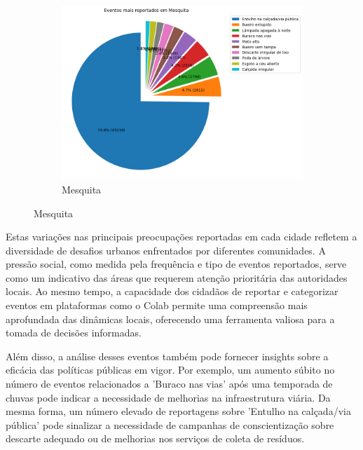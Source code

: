 \begin{figure}[htb]
\begin{subfigure}[b]{0.317\textwidth}
	\end{subfigure} ~
	\begin{subfigure}[b]{0.317\textwidth}
		\includegraphics[width=\textwidth]{images/pie_event_distribution_mesquita.png}
		\caption{Mesquita}
		\label{fig:mesquita-pie}
	\end{subfigure}
\end{figure}


Estas variações nas principais preocupações reportadas em cada cidade refletem a diversidade de desafios urbanos enfrentados por diferentes comunidades. A pressão social, como medida pela frequência e tipo de eventos reportados, serve como um indicativo das áreas que requerem atenção prioritária das autoridades locais. Ao mesmo tempo, a capacidade dos cidadãos de reportar e categorizar eventos em plataformas como o Colab permite uma compreensão mais aprofundada das dinâmicas locais, oferecendo uma ferramenta valiosa para a tomada de decisões informadas.

Além disso, a análise desses eventos também pode fornecer insights sobre a eficácia das políticas públicas em vigor. Por exemplo, um aumento súbito no número de eventos relacionados a 'Buraco nas vias' após uma temporada de chuvas pode indicar a necessidade de melhorias na infraestrutura viária. Da mesma forma, um número elevado de reportagens sobre 'Entulho na calçada/via pública' pode sinalizar a necessidade de campanhas de conscientização sobre descarte adequado ou de melhorias nos serviços de coleta de resíduos.


